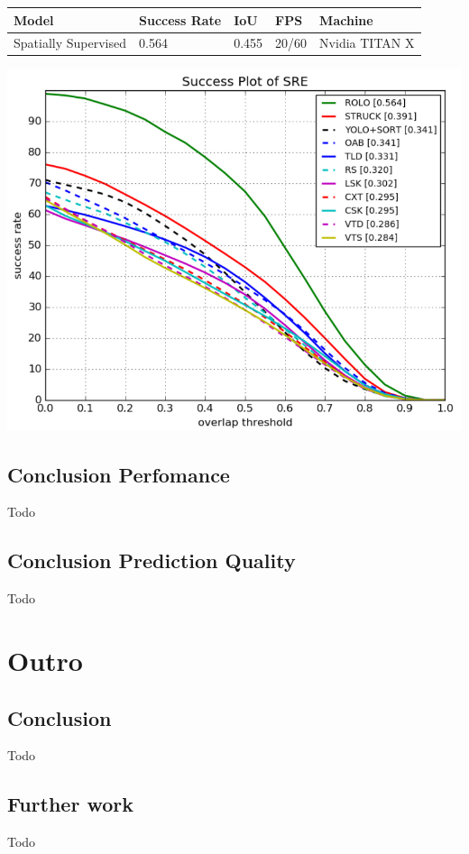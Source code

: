 \documentclass[conference]{IEEEtran}
\begin{document}
\begin{tabular}{ | p{2cm} | p{3em}| p{2em} | p{4em} | p{4em} | } 
 \hline
 Model & Success Rate & IoU & FPS & Machine \\
 \hline
 Spatially Supervised \cite{b5} & 0.564 & 0.455 & 20/60 & Nvidia TITAN X \\
 \hline
\end{tabular}
\includegraphics[width=\columnwidth]{otb-challenge-results}

\subsection{Conclusion Perfomance}
Todo

\subsection{Conclusion Prediction Quality}
Todo


\section{Outro}

\subsection{Conclusion}
Todo

\subsection{Further work}
Todo
\end{document}

